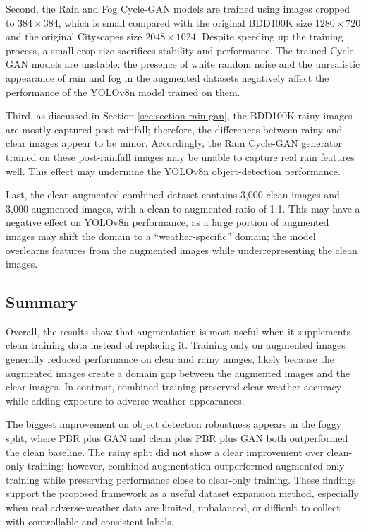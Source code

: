 \documentclass[10pt,letterpaper]{article}
\begin{document}
Second, the Rain and Fog Cycle-GAN models are trained using images cropped to $384\times384$, which is small compared with the original BDD100K size $1280\times720$ and the original Cityscapes size $2048\times1024$. 
Despite speeding up the training process, a small crop size sacrifices stability and performance. The trained Cycle-GAN models are unstable: the presence of white random noise and the unrealistic appearance of rain and fog in the augmented datasets negatively affect the performance of the YOLOv8n model trained on them. 

Third, as discussed in Section \ref{sec:section-rain-gan}, the BDD100K rainy images are mostly captured post-rainfall; therefore, the differences between rainy and clear images appear to be minor. 
Accordingly, the Rain Cycle-GAN generator trained on these post-rainfall images may be unable to capture real rain features well. This effect may undermine the YOLOv8n object-detection performance.

Last, the clean-augmented combined dataset contains 3,000 clean images and 3,000 augmented images, with a clean-to-augmented ratio of 1:1. This may have a negative effect on YOLOv8n performance, 
as a large portion of augmented images may shift the domain to a ``weather-specific'' domain; the model overlearns features from the augmented images while underrepresenting the clean images.

\subsection{Summary}
Overall, the results show that augmentation is most useful when it supplements clean training data instead of replacing it.
Training only on augmented images generally reduced performance on clear and rainy images, likely because the augmented images create a domain gap between the augmented images and the clear images.
In contrast, combined training preserved clear-weather accuracy while adding exposure to adverse-weather appearances.

The biggest improvement on object detection robustness appears in the foggy split, where PBR plus GAN and clean plus PBR plus GAN both outperformed the clean baseline.
The rainy split did not show a clear improvement over clean-only training; however, combined augmentation outperformed augmented-only training while preserving performance close to clear-only training.
These findings support the proposed framework as a useful dataset expansion method, especially when real adverse-weather data are limited, unbalanced, or difficult to collect with controllable and consistent labels.
\end{document}
